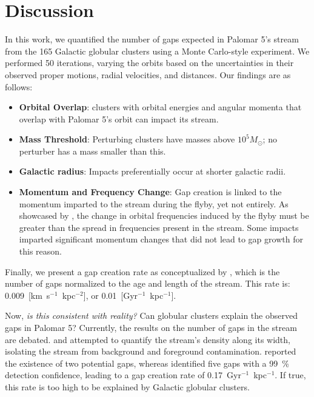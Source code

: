 \documentclass{aa}
\begin{document}
\section{Discussion}


  In this work, we quantified the number of gaps expected in Palomar 5's stream from the 165 Galactic globular clusters using a Monte Carlo-style experiment. We performed 50 iterations, varying the orbits based on the uncertainties in their observed proper motions, radial velocities, and distances. Our findings are as follows:

  \begin{itemize}
    \item \textbf{Orbital Overlap}: clusters with orbital energies and angular momenta that overlap with Palomar 5's orbit can impact its stream.
    \item \textbf{Mass Threshold}: Perturbing clusters have masses above $10^5 M_\odot$; no perturber has a mass smaller than this.
    \item \textbf{Galactic radius}: Impacts preferentially occur at shorter galactic radii.
    \item \textbf{Momentum and Frequency Change}: Gap creation is linked to the momentum imparted to the stream during the flyby, yet not entirely. As showcased by \citet{2016MNRAS.457.3817S}, the change in orbital frequencies induced by the flyby must be greater than the spread in frequencies present in the stream. Some impacts imparted significant momentum changes that did not lead to gap growth for this reason.
  \end{itemize}

  Finally, we present a gap creation rate as conceptualized by \citet{2012ApJ...748...20C}, which is the number of gaps normalized to the age and length of the stream. This rate is: 0.009~[km~s$^{-1}$~kpc$^{-2}$], or 0.01~[Gyr$^{-1}$~kpc$^{-1}$].


  Now, \textit{is this consistent with reality?} Can globular clusters explain the observed gaps in Palomar 5? Currently, the results on the number of gaps in the stream are debated. \citet{2012ApJ...760...75C} and \citet{2020ApJ...889...70B} attempted to quantify the stream's density along its width, isolating the stream from background and foreground contamination. \citet{2020ApJ...889...70B} reported the existence of two potential gaps, whereas \citet{2012ApJ...760...75C} identified five gaps with a 99~\% detection confidence, leading to a gap creation rate of 0.17~Gyr$^{-1}$~kpc$^{-1}$. If true, this rate is too high to be explained by Galactic globular clusters.
\end{document}
